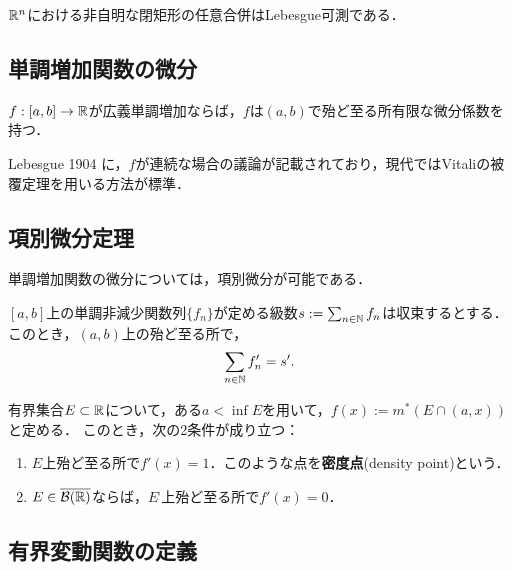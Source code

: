 \documentclass[uplatex, dvipdfmx]{jsreport}
\begin{document}
\begin{corollary}\label{cor-Vitali}
    $\mathbb{R}^n$における非自明な閉矩形の任意合併はLebesgue可測である．
\end{corollary}

\subsection{単調増加関数の微分}

\begin{theorem}[Lebesgue]
    $f:[a,b]\to\mathbb{R}$が広義単調増加ならば，$f$は$(a,b)$で殆ど至る所有限な微分係数を持つ．
\end{theorem}
\begin{history}
    Lebesgue 1904 \cite{Lebesgue04}に，$f$が連続な場合の議論が記載されており，現代ではVitaliの被覆定理を用いる方法が標準．
\end{history}

\subsection{項別微分定理}

\begin{tcolorbox}[colframe=ForestGreen, colback=ForestGreen!10!white,breakable,colbacktitle=ForestGreen!40!white,coltitle=black,fonttitle=\bfseries\sffamily,
title=]
    単調増加関数の微分については，項別微分が可能である．
\end{tcolorbox}

\begin{theorem}[Fubiniの項別微分定理 (1915)]
    $[a,b]$上の単調非減少関数列$\{f_n\}$が定める級数$s:=\sum_{n\in\mathbb{N}}f_n$は収束するとする．
    このとき，$(a,b)$上の殆ど至る所で，
    \[\sum_{n\in\mathbb{N}}f'_n=s'.\]
\end{theorem}

\begin{theorem}[Lebesgueの密度定理 (1904)]
    有界集合$E\subset\mathbb{R}$について，ある$a<\inf E$を用いて，$f(x):=m^*(E\cap(a,x))$と定める．
    このとき，次の2条件が成り立つ：
    \begin{enumerate}
        \item $E$上殆ど至る所で$f'(x)=1$．このような点を\textbf{密度点}(density point)という．
        \item $E\in\overline{\mathcal{B}(\mathbb{R})}$ならば，$E^\comp$上殆ど至る所で$f'(x)=0$．
    \end{enumerate}
\end{theorem}

\subsection{有界変動関数の定義}
\end{document}
